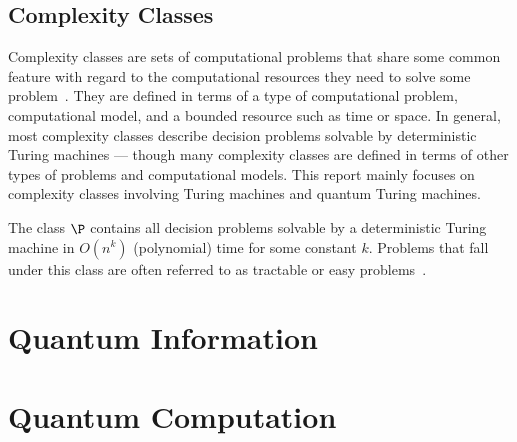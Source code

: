 \subsection{Complexity Classes}
Complexity classes are sets of computational problems that share some common feature with regard to the computational resources they need to solve some problem~\cite{arora2009computational}.
They are defined in terms of a type of computational problem, computational model, and a bounded resource such as time or space.
In general, most complexity classes describe decision problems solvable by deterministic Turing machines --- though many complexity classes are defined in terms of other types of problems and computational models.
This report mainly focuses on complexity classes involving Turing machines and quantum Turing machines.

The class $\P$ contains all decision problems solvable by a deterministic Turing machine in $O(n^k)$ (polynomial) time for some constant $k$.
Problems that fall under this class are often referred to as tractable or easy problems~\cite{cormen2009introduction}.

\section{Quantum Information}

\section{Quantum Computation}